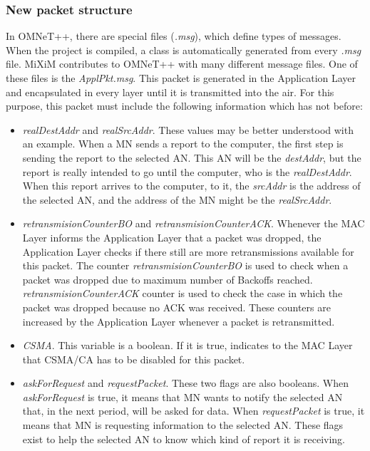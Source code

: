 \subsubsection{New packet structure}
\label{sec:packetstructure}

In \ac{OMNeT++}, there are special files (\textit{.msg}), which define types of messages. When the project is compiled, a class is automatically 
generated from every \textit{.msg} file. \ac{MiXiM} contributes to \ac{OMNeT++} with many different message files. One of these files is the 
\textit{ApplPkt.msg}. This packet is generated in the Application Layer and encapsulated in every layer until it is transmitted into the 
air. For this purpose, this packet must include the following information which has not before:
\begin{itemize}
 \item \textit{realDestAddr} and \textit{realSrcAddr}. These values may be better understood with an example. When a \ac{MN} sends a report to the 
computer, the first step is sending the report to the selected \ac{AN}. This \ac{AN} will be the \textit{destAddr}, but the report is really intended
to go until the computer, who is the \textit{realDestAddr}. When this report arrives to the computer, to it, the \textit{srcAddr} is the 
address of the selected \ac{AN}, and the address of the \ac{MN} might be the \textit{realSrcAddr}.
 \item \textit{retransmisionCounterBO} and \textit{retransmisionCounterACK}. Whenever the \ac{MAC} Layer informs the Application Layer that a 
packet was dropped, the Application Layer checks if there still are more retransmissions available for this packet. The counter
\textit{retransmisionCounterBO} is used to check when a packet was dropped due to maximum number of Backoffs reached. \textit{retransmisionCounterACK} 
counter is used to check the case in which the packet was dropped because no \ac{ACK} was received. These counters are
increased by the Application Layer whenever a packet is retransmitted.
 \item \textit{CSMA}. This variable is a boolean. If it is true, indicates to the \ac{MAC} Layer that \ac{CSMA/CA} has to be disabled for 
this packet.
 \item \textit{askForRequest} and \textit{requestPacket}. These two flags are also booleans. When \textit{askForRequest} is true, it means
that \ac{MN} wants to notify the selected \ac{AN} that, in the next period, will be asked for data. When \textit{requestPacket} is true, it
means that \ac{MN} is requesting information to the selected \ac{AN}. These flags exist to help the selected \ac{AN} to know which kind of 
report it is receiving.
\end{itemize}

